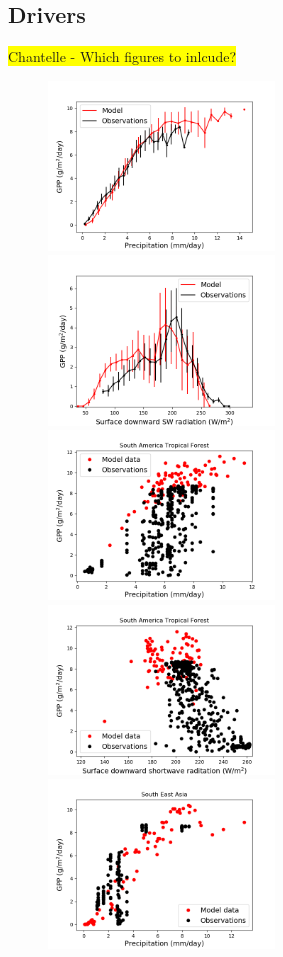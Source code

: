 \documentclass[bg, manuscript]{copernicus}
\newcommand{\hilight}[1]{\colorbox{yellow}{#1}}
\begin{document}
\subsection{Drivers}
\hilight{Chantelle - Which figures to inlcude?}
\begin{figure}[t]
    \includegraphics[width=6cm]{figs/GPPresponse/tl.png}
    \includegraphics[width=6cm]{figs/GPPresponse/tr.png}
    \includegraphics[width=6cm]{figs/GPPresponse/ml.png}
    \includegraphics[width=6cm]{figs/GPPresponse/mr.png}
    \includegraphics[width=6cm]{figs/GPPresponse/bl.png}

\end{figure}
\end{document}
